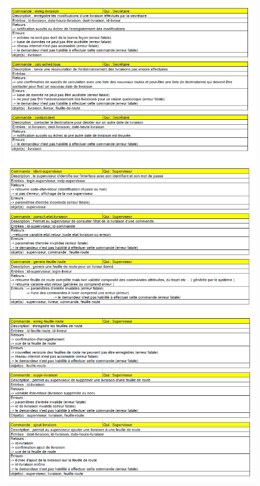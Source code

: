 \documentclass{report}
\begin{document}
\includegraphics[scale = 0.7]{images/DCOM3.jpg}\\
\includegraphics[scale = 0.7]{images/DCOM4.jpg}\\
\includegraphics[scale = 0.7]{images/DCOM5.jpg}\\
\end{document}
